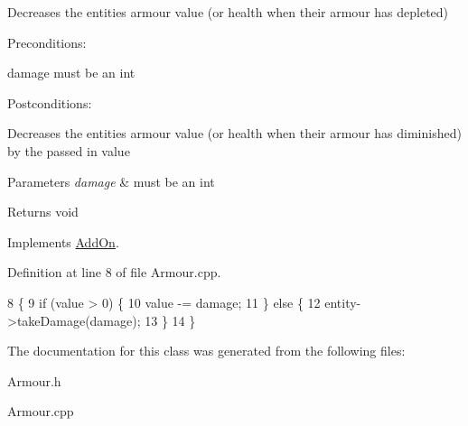 Decreases the entities\textquotesingle{} armour value (or health when their armour has depleted) 

Preconditions\+:
\begin{DoxyItemize}
\item damage must be an int
\end{DoxyItemize}

Postconditions\+:
\begin{DoxyItemize}
\item Decreases the entities\textquotesingle{} armour value (or health when their armour has diminished) by the passed in value
\end{DoxyItemize}


\begin{DoxyParams}{Parameters}
{\em damage} & must be an int \\
\hline
\end{DoxyParams}
\begin{DoxyReturn}{Returns}
void 
\end{DoxyReturn}


Implements \hyperlink{classAddOn}{Add\+On}.



Definition at line 8 of file Armour.\+cpp.


\begin{DoxyCode}
8                                   \{
9     \textcolor{keywordflow}{if} (value > 0) \{
10         value -= damage;
11     \} \textcolor{keywordflow}{else} \{
12         entity->takeDamage(damage);
13     \}
14 \}
\end{DoxyCode}


The documentation for this class was generated from the following files\+:\begin{DoxyCompactItemize}
\item 
Armour.\+h\item 
Armour.\+cpp\end{DoxyCompactItemize}
